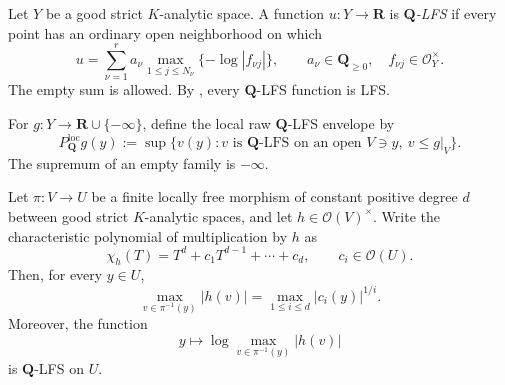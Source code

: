 
\begin{definition}
\label{def:p031-rational-lfs}
Let $Y$ be a good strict $K$-analytic space.  A function $u:Y\to\mathbf R$
is \emph{$\mathbf Q$-LFS} if every point has an ordinary open neighborhood
on which
\begin{equation}
\label{eq:p031-rational-lfs-normal-form}
 u=\sum_{\nu=1}^{r}a_\nu
       \max_{1\leq j\leq N_\nu}\{-\log|f_{\nu j}|\},
 \qquad
 a_\nu\in\mathbf Q_{\geq0},\quad
 f_{\nu j}\in\mathcal O_Y^\times.
\end{equation}
The empty sum is allowed.  By \cite[\S7.9, p.~190]{GJR26}, every
$\mathbf Q$-LFS function is LFS.

For $g:Y\to\mathbf R\cup\{-\infty\}$, define the local raw
$\mathbf Q$-LFS envelope by
\begin{equation}
\label{eq:p031-local-rational-lfs-envelope}
 P_{\mathbf Q}^{\mathrm{loc}}g(y)
   :=\sup\{v(y):v\text{ is $\mathbf Q$-LFS on an open }V\ni y,
                    \ v\leq g|_V\}.
\end{equation}
The supremum of an empty family is $-\infty$.
\end{definition}

\begin{lemma}
\label{lem:p031-characteristic-spectral-maximum}
Let $\pi:V\to U$ be a finite locally free morphism of constant positive
degree $d$ between good strict $K$-analytic spaces, and let
$h\in\mathcal O(V)^\times$.  Write the characteristic polynomial of
multiplication by $h$ as
\begin{equation}
\label{eq:p031-characteristic-polynomial}
 \chi_h(T)=T^d+c_1T^{d-1}+\cdots+c_d,
 \qquad c_i\in\mathcal O(U).
\end{equation}
Then, for every $y\in U$,
\begin{equation}
\label{eq:p031-characteristic-spectral-maximum}
 \max_{v\in\pi^{-1}(y)}|h(v)|
       =\max_{1\leq i\leq d}|c_i(y)|^{1/i}.
\end{equation}
Moreover, the function
\begin{equation}
\label{eq:p031-log-spectral-maximum}
 y\longmapsto\log\max_{v\in\pi^{-1}(y)}|h(v)|
\end{equation}
is $\mathbf Q$-LFS on $U$.
\end{lemma}

